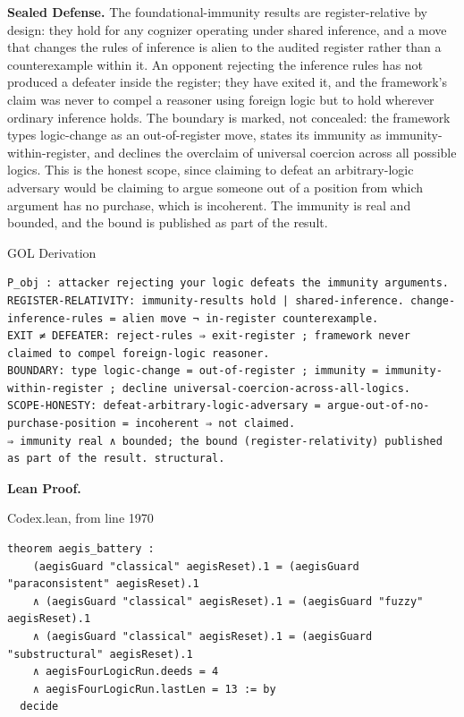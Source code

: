 \documentclass[10pt,twocolumn]{article}
\begin{document}
\textbf{Sealed Defense.} The foundational-immunity results are
register-relative by design: they hold for any cognizer operating under
shared inference, and a move that changes the rules of inference is
alien to the audited register rather than a counterexample within it. An
opponent rejecting the inference rules has not produced a defeater
inside the register; they have exited it, and the framework's claim was
never to compel a reasoner using foreign logic but to hold wherever
ordinary inference holds. The boundary is marked, not concealed: the
framework types logic-change as an out-of-register move, states its
immunity as immunity-within-register, and declines the overclaim of
universal coercion across all possible logics. This is the honest scope,
since claiming to defeat an arbitrary-logic adversary would be claiming
to argue someone out of a position from which argument has no purchase,
which is incoherent. The immunity is real and bounded, and the bound is
published as part of the result.

\begin{golbox}{GOL Derivation}
\begin{lstlisting}[style=golv]
P_obj : attacker rejecting your logic defeats the immunity arguments.
REGISTER-RELATIVITY: immunity-results hold | shared-inference. change-inference-rules = alien move ¬ in-register counterexample.
EXIT ≠ DEFEATER: reject-rules ⇒ exit-register ; framework never claimed to compel foreign-logic reasoner.
BOUNDARY: type logic-change = out-of-register ; immunity = immunity-within-register ; decline universal-coercion-across-all-logics.
SCOPE-HONESTY: defeat-arbitrary-logic-adversary = argue-out-of-no-purchase-position = incoherent ⇒ not claimed.
⇒ immunity real ∧ bounded; the bound (register-relativity) published as part of the result. structural.
\end{lstlisting}
\end{golbox}

\textbf{Lean Proof.}

\begin{leanexcerpt}{Codex.lean, from line 1970}
\begin{lstlisting}[style=leanx,firstnumber=1970]
theorem aegis_battery :
    (aegisGuard "classical" aegisReset).1 = (aegisGuard "paraconsistent" aegisReset).1
    ∧ (aegisGuard "classical" aegisReset).1 = (aegisGuard "fuzzy" aegisReset).1
    ∧ (aegisGuard "classical" aegisReset).1 = (aegisGuard "substructural" aegisReset).1
    ∧ aegisFourLogicRun.deeds = 4
    ∧ aegisFourLogicRun.lastLen = 13 := by
  decide
\end{lstlisting}
\end{leanexcerpt}
\end{document}
